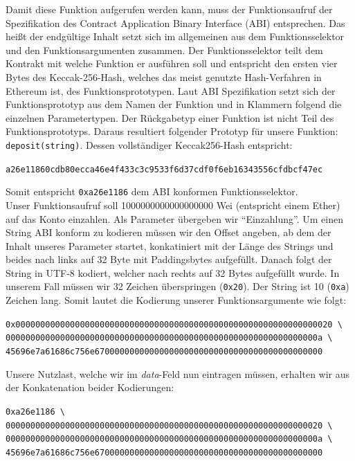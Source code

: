 \documentclass[runningheads]{llncs}
\begin{document}
Damit diese Funktion aufgerufen werden kann, muss der Funktionsaufruf der Spezifikation des Contract Application Binary Interface (ABI) entsprechen. %
Das heißt der endgültige Inhalt setzt sich im allgemeinen aus dem Funktionsselektor und den Funktionsargumenten zusammen. Der Funktionsselektor teilt dem Kontrakt mit welche Funktion er ausführen soll und entspricht den ersten vier Bytes des Keccak-256-Hash, welches das meist genutzte Hash-Verfahren in Ethereum ist, des Funktionsprototypen. Laut ABI Spezifikation setzt sich der Funktionsprototyp aus dem Namen der Funktion und in Klammern folgend die einzelnen Parametertypen. Der Rückgabetyp einer Funktion ist nicht Teil des Funktionsprototyps.
Daraus resultiert folgender Prototyp für unsere Funktion: \texttt{deposit(string)}.
Dessen vollständiger Keccak256-Hash entspricht:
\begingroup
\fontsize{8pt}{10pt}\selectfont
\begin{center}
  \texttt{a26e11860cdb80ecca46e4f433c3c9533f6d37cdf0f6eb16343556cfdbcf47ec}
\end{center}
\endgroup
Somit entspricht \texttt{0xa26e1186} dem ABI konformen Funktionsselektor.\\
Unser Funktionsaufruf soll 1000000000000000000 Wei (entspricht einem Ether) auf das Konto einzahlen. Als Parameter übergeben wir "`Einzahlung"'. Um einen String ABI konform zu kodieren müssen wir den Offset angeben, ab dem der Inhalt unseres Parameter startet, konkatiniert mit der Länge des Strings und beides nach links auf 32 Byte mit Paddingsbytes aufgefüllt. Danach folgt der String in UTF-8 kodiert, welcher nach rechts auf 32 Bytes aufgefüllt wurde. In unserem Fall müssen wir 32 Zeichen überspringen (\texttt{0x20}). Der String ist 10 (\texttt{0xa}) Zeichen lang. Somit lautet die Kodierung unserer Funktionsargumente wie folgt: 
\begingroup
\fontsize{8pt}{10pt}\selectfont
\begin{center}
  \texttt{0x0000000000000000000000000000000000000000000000000000000000000020 \textbackslash} \\
  \texttt{000000000000000000000000000000000000000000000000000000000000000a \textbackslash} \\
  \texttt{45696e7a61686c756e6700000000000000000000000000000000000000000000}
\end{center}
\endgroup
Unsere Nutzlast, welche wir im \textit{data}-Feld nun eintragen müssen, erhalten wir aus der Konkatenation beider Kodierungen:
\begingroup
\fontsize{8pt}{10pt}\selectfont
\begin{center}
  \texttt{0xa26e1186 \textbackslash} \\
  \texttt{0000000000000000000000000000000000000000000000000000000000000020 \textbackslash} \\
  \texttt{000000000000000000000000000000000000000000000000000000000000000a \textbackslash} \\
  \texttt{45696e7a61686c756e6700000000000000000000000000000000000000000000}
\end{center}
\endgroup
\end{document}
